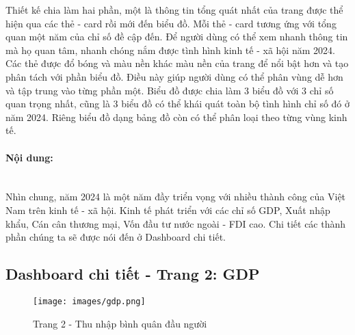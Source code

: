 \documentclass[a4paper]{report}
\begin{document}
{{Thiết kế chia làm hai phần, một là thông tin tổng quát nhất của trang được thể hiện qua các thẻ - card rồi mới đến biểu đồ. Mỗi thẻ - card tương ứng với tổng quan một năm của chỉ số đề cập đến.
Để người dùng có thể xem nhanh thông tin mà họ quan tâm, nhanh chóng nắm được tình hình kinh tế - xã hội năm 2024. Các thẻ được đổ bóng và màu nền khác màu nền của trang để nổi bật hơn và tạo phân tách với phần biểu đồ. Điều này giúp người dùng có thể phân vùng dễ hơn và tập trung vào từng phần một.
Biểu đồ được chia làm 3 biểu đồ với 3 chỉ số quan trọng nhất, cũng là 3 biểu đồ có thể khái quát toàn bộ tình hình chỉ số đó ở năm 2024. Riêng biểu đồ dạng bảng đồ còn có thể phân loại theo từng vùng kinh tế.\\

\paragraph{Nội dung:} \mbox{}\\

Nhìn chung, năm 2024 là một năm đầy triển vọng với nhiều thành công của Việt Nam trên kinh tế - xã hội. Kinh tế phát triển với các chỉ số GDP, Xuất nhập khẩu, Cán cân thương mại, Vốn đầu tư nước ngoài - FDI cao. Chi tiết các thành phần chúng ta sẽ được nói đến ở Dashboard chi tiết.\\

\subsection{Dashboard chi tiết - Trang 2: GDP}
\begin{figure}[H]
    \centering
    \texttt{[image: images/gdp.png]}
    \caption{Trang 2 - Thu nhập bình quân đầu người}
    \label{fig:enter-label}
\end{figure}

}}
\end{document}
